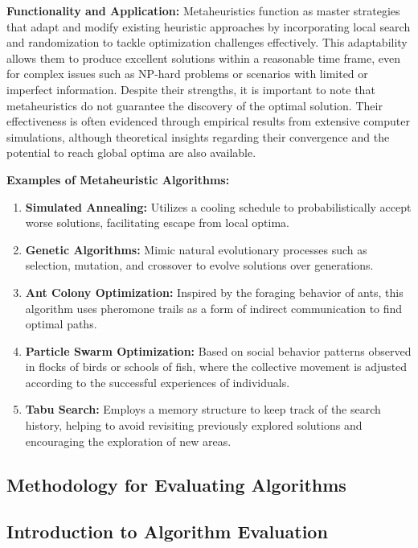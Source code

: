 \documentclass{article}
\begin{document}
    \textbf{Functionality and Application:}
    Metaheuristics function as master strategies that adapt and modify existing heuristic approaches by incorporating local search and randomization to tackle optimization challenges effectively.
    This adaptability allows them to produce excellent solutions within a reasonable time frame, even for complex issues such as NP-hard problems or scenarios with limited or imperfect information.
    Despite their strengths, it is important to note that metaheuristics do not guarantee the discovery of the optimal solution.
    Their effectiveness is often evidenced through empirical results from extensive computer simulations, although theoretical insights regarding their convergence and the potential to reach global optima are also available. \cite{kaveh2021}

    \textbf{Examples of Metaheuristic Algorithms:}~\cite{kaveh2021}
    \begin{enumerate}
        \item \textbf{Simulated Annealing:} Utilizes a cooling schedule to probabilistically accept worse solutions, facilitating escape from local optima.
        \item \textbf{Genetic Algorithms:} Mimic natural evolutionary processes such as selection, mutation, and crossover to evolve solutions over generations.
        \item \textbf{Ant Colony Optimization:} Inspired by the foraging behavior of ants, this algorithm uses pheromone trails as a form of indirect communication to find optimal paths.
        \item \textbf{Particle Swarm Optimization:} Based on social behavior patterns observed in flocks of birds or schools of fish, where the collective movement is adjusted according to the successful experiences of individuals.
        \item \textbf{Tabu Search:} Employs a memory structure to keep track of the search history, helping to avoid revisiting previously explored solutions and encouraging the exploration of new areas.
    \end{enumerate}

    \newpage

    \subsection{Methodology for Evaluating Algorithms}\label{methodology-for-evaluating-algorithms}

    \subsection{Introduction to Algorithm Evaluation}\label{subsec:introduction}
\end{document}
